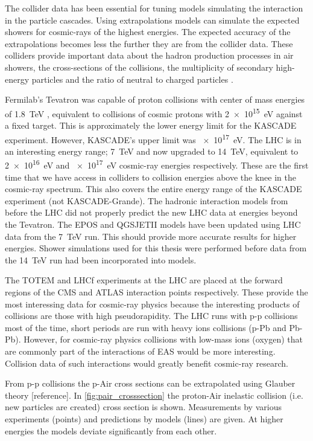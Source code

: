 The collider data has been essential for tuning models simulating the interaction in the particle cascades. Using extrapolations models can simulate the expected showers for cosmic-rays of the highest energies. The expected accuracy of the extrapolations becomes less the further they are from the collider data. These colliders provide important data about the hadron production processes in air showers, the cross-sections of the collisions, the multiplicity of secondary high-energy particles and the ratio of neutral to charged particles \cite{pierog2008lhc}.

Fermilab's Tevatron was capable of proton collisions with center of mass energies of \SI{1.8}{\TeV} \cite{abe1994tevatron}, equivalent to collisions of cosmic protons with \SI{2e15}{\eV} against a fixed target. This is approximately the lower energy limit for the KASCADE experiment. However, KASCADE's upper limit was \SI{e17}{\eV}. The LHC is in an interesting energy range; \SI{7}{\TeV} and now upgraded to \SI{14}{\TeV}, equivalent to \SI{2e16}{\eV} and \SI{e17}{\eV} cosmic-ray energies respectively. These are the first time that we have access in colliders to collision energies above the knee in the cosmic-ray spectrum. This also covers the entire energy range of the KASCADE experiment (not KASCADE-Grande). The hadronic interaction models from before the LHC did not properly predict the new LHC data at energies beyond the Tevatron. The EPOS and QGSJETII models have been updated using LHC data from the \SI{7}{\TeV} run. This should provide more accurate results for higher energies. Shower simulations used for this thesis were performed before data from the \SI{14}{\TeV} run had been incorporated into models.

The TOTEM and LHCf experiments at the LHC are placed at the forward regions of the CMS and ATLAS interaction points respectively. These provide the most interessing data for cosmic-ray physics because the interesting products of collisions are those with high pseudorapidity. The LHC runs with p-p collisions most of the time, short periods are run with heavy ions collisions (p-Pb and Pb-Pb). However, for cosmic-ray physics collisions with low-mass ions (oxygen) that are commonly part of the interactions of EAS would be more interesting. Collision data of such interactions would greatly benefit cosmic-ray research.

From p-p collisions the p-Air cross sections can be extrapolated using Glauber theory [reference]. In \cref{fig:pair_crosssection} the proton-Air inelastic collision (i.e. new particles are created) cross section is shown. Measurements by various experiments (points) and predictions by models (lines) are given. At higher energies the models deviate significantly from each other.

